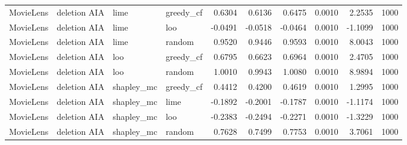 \begin{longtable}{@{}p{.12\linewidth}p{.18\linewidth}p{.13\linewidth}p{.13\linewidth}rrrrrr@{}}
MovieLens & deletion AIA & lime & greedy\_cf & 0.6304 & 0.6136 & 0.6475 & 0.0010 & 2.2535 & 1000 \\
MovieLens & deletion AIA & lime & loo & -0.0491 & -0.0518 & -0.0464 & 0.0010 & -1.1099 & 1000 \\
MovieLens & deletion AIA & lime & random & 0.9520 & 0.9446 & 0.9593 & 0.0010 & 8.0043 & 1000 \\
MovieLens & deletion AIA & loo & greedy\_cf & 0.6795 & 0.6623 & 0.6964 & 0.0010 & 2.4705 & 1000 \\
MovieLens & deletion AIA & loo & random & 1.0010 & 0.9943 & 1.0080 & 0.0010 & 8.9894 & 1000 \\
MovieLens & deletion AIA & shapley\_mc & greedy\_cf & 0.4412 & 0.4200 & 0.4619 & 0.0010 & 1.2995 & 1000 \\
MovieLens & deletion AIA & shapley\_mc & lime & -0.1892 & -0.2001 & -0.1787 & 0.0010 & -1.1174 & 1000 \\
MovieLens & deletion AIA & shapley\_mc & loo & -0.2383 & -0.2494 & -0.2271 & 0.0010 & -1.3229 & 1000 \\
MovieLens & deletion AIA & shapley\_mc & random & 0.7628 & 0.7499 & 0.7753 & 0.0010 & 3.7061 & 1000 \\
\end{longtable}
